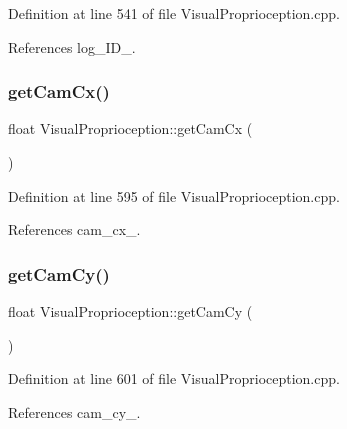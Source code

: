 Definition at line 541 of file Visual\+Proprioception.\+cpp.



References log\+\_\+\+I\+D\+\_\+.

\mbox{\label{classVisualProprioception_aca4a0fe7a02cdab6fa8587fd0341d824}} 
\subsubsection{\texorpdfstring{get\+Cam\+Cx()}{getCamCx()}}
{\footnotesize\ttfamily float Visual\+Proprioception\+::get\+Cam\+Cx (\begin{DoxyParamCaption}{ }\end{DoxyParamCaption})}



Definition at line 595 of file Visual\+Proprioception.\+cpp.



References cam\+\_\+cx\+\_\+.

\mbox{\label{classVisualProprioception_a1fb91fd83b8bf70134f36b3c8f3023b5}} 
\subsubsection{\texorpdfstring{get\+Cam\+Cy()}{getCamCy()}}
{\footnotesize\ttfamily float Visual\+Proprioception\+::get\+Cam\+Cy (\begin{DoxyParamCaption}{ }\end{DoxyParamCaption})}



Definition at line 601 of file Visual\+Proprioception.\+cpp.



References cam\+\_\+cy\+\_\+.

\mbox{\label{classVisualProprioception_a91eb7689001066cc251ebc4aa45e361e}} 
